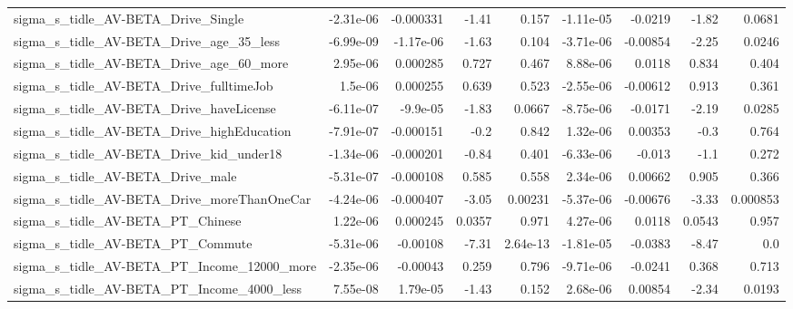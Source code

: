 \begin{tabular}{lrrrrrrrr}
sigma\_s\_tidle\_AV-BETA\_Drive\_Single                 &   -2.31e-06 &    -0.000331 &     -1.41 &    0.157 &  -1.11e-05 &     -0.0219 &        -1.82 &        0.0681 \\
sigma\_s\_tidle\_AV-BETA\_Drive\_age\_35\_less            &   -6.99e-09 &    -1.17e-06 &     -1.63 &    0.104 &  -3.71e-06 &    -0.00854 &        -2.25 &        0.0246 \\
sigma\_s\_tidle\_AV-BETA\_Drive\_age\_60\_more            &    2.95e-06 &     0.000285 &     0.727 &    0.467 &   8.88e-06 &      0.0118 &        0.834 &         0.404 \\
sigma\_s\_tidle\_AV-BETA\_Drive\_fulltimeJob            &     1.5e-06 &     0.000255 &     0.639 &    0.523 &  -2.55e-06 &    -0.00612 &        0.913 &         0.361 \\
sigma\_s\_tidle\_AV-BETA\_Drive\_haveLicense            &   -6.11e-07 &     -9.9e-05 &     -1.83 &   0.0667 &  -8.75e-06 &     -0.0171 &        -2.19 &        0.0285 \\
sigma\_s\_tidle\_AV-BETA\_Drive\_highEducation          &   -7.91e-07 &    -0.000151 &      -0.2 &    0.842 &   1.32e-06 &     0.00353 &         -0.3 &         0.764 \\
sigma\_s\_tidle\_AV-BETA\_Drive\_kid\_under18            &   -1.34e-06 &    -0.000201 &     -0.84 &    0.401 &  -6.33e-06 &      -0.013 &         -1.1 &         0.272 \\
sigma\_s\_tidle\_AV-BETA\_Drive\_male                   &   -5.31e-07 &    -0.000108 &     0.585 &    0.558 &   2.34e-06 &     0.00662 &        0.905 &         0.366 \\
sigma\_s\_tidle\_AV-BETA\_Drive\_moreThanOneCar         &   -4.24e-06 &    -0.000407 &     -3.05 &  0.00231 &  -5.37e-06 &    -0.00676 &        -3.33 &      0.000853 \\
sigma\_s\_tidle\_AV-BETA\_PT\_Chinese                   &    1.22e-06 &     0.000245 &    0.0357 &    0.971 &   4.27e-06 &      0.0118 &       0.0543 &         0.957 \\
sigma\_s\_tidle\_AV-BETA\_PT\_Commute                   &   -5.31e-06 &     -0.00108 &     -7.31 & 2.64e-13 &  -1.81e-05 &     -0.0383 &        -8.47 &           0.0 \\
sigma\_s\_tidle\_AV-BETA\_PT\_Income\_12000\_more         &   -2.35e-06 &     -0.00043 &     0.259 &    0.796 &  -9.71e-06 &     -0.0241 &        0.368 &         0.713 \\
sigma\_s\_tidle\_AV-BETA\_PT\_Income\_4000\_less          &    7.55e-08 &     1.79e-05 &     -1.43 &    0.152 &   2.68e-06 &     0.00854 &        -2.34 &        0.0193 \\

\end{tabular}
